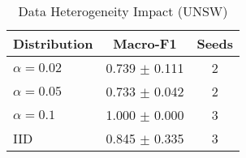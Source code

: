 \begin{table}[htbp]
\centering
\caption{Data Heterogeneity Impact (UNSW)}\label{tab:hetero_unsw}
\begin{tabular}{lcc}
\toprule
Distribution & Macro-F1 & Seeds \\
\midrule
$\alpha=0.02$ & 0.739 $\pm$ 0.111 & 2 \\
$\alpha=0.05$ & 0.733 $\pm$ 0.042 & 2 \\
$\alpha=0.1$ & 1.000 $\pm$ 0.000 & 3 \\
IID & 0.845 $\pm$ 0.335 & 3 \\
\bottomrule
\end{tabular}
\end{table}
